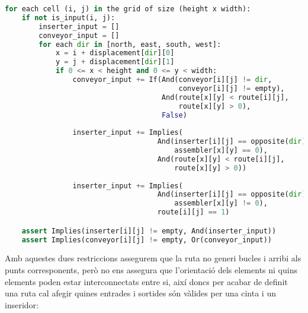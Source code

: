 \begin{lstlisting}[language=Python, caption=Backwards Consistency, label=code:backwards_route]
for each cell (i, j) in the grid of size (height x width):
    if not is_input(i, j):
        inserter_input = []
        conveyor_input = []
        for each dir in [north, east, south, west]:
            x = i + displacement[dir][0]
            y = j + displacement[dir][1]
            if 0 <= x < height and 0 <= y < width:
                conveyor_input += If(And(conveyor[i][j] != dir,
                                         conveyor[i][j] != empty),
                                     And(route[x][y] < route[i][j],
                                         route[x][y] > 0),
                                     False)
        
                inserter_input += Implies(
                                    And(inserter[i][j] == opposite(dir),
                                        assembler[x][y] == 0),
                                    And(route[x][y] < route[i][j],
                                        route[x][y] > 0))
        
                inserter_input += Implies(
                                    And(inserter[i][j] == opposite(dir),
                                        assembler[x][y] != 0),
                                    route[i][j] == 1)

    assert Implies(inserter[i][j] != empty, And(inserter_input))
    assert Implies(conveyor[i][j] != empty, Or(conveyor_input))
\end{lstlisting}

Amb aquestes dues restriccions assegurem que la ruta no generi bucles i arribi als punts corresponents, però no ens assegura que l'orientació dels elements ni quins elements poden estar interconnectats entre si, així doncs per acabar de definit una ruta cal afegir quines entrades i sortides són vàlides per una cinta i un inseridor:

